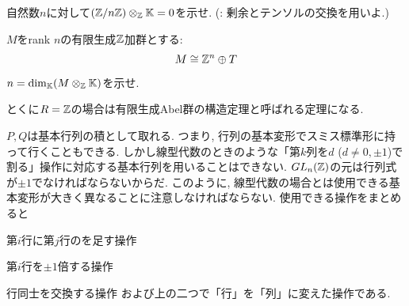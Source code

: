 \begin{prac}
\ben
\item 自然数$n$に対して$(\mathbb{Z}/n\mathbb{Z})\mathbin{\otimes}_{\mathbb{Z}} \mathbb{K}  = 0$を示せ. (: 剰余とテンソルの交換を用いよ.)
\item $M$をrank $n$の有限生成$\mathbb{Z}$加群とする:
\[M\cong \mathbb{Z}^{n} \oplus T\]
$n=\dim_{\mathbb{K}} (M\mathbin{\otimes}_{\mathbb{Z}} \mathbb{K})$を示せ.
\een
\end{prac}

\begin{rem}
とくに$R=\mathbb{Z}$の場合は有限生成Abel群の構造定理と呼ばれる定理になる.
\end{rem}


\begin{rem}
$P,Q$は基本行列の積として取れる. つまり, 行列の基本変形でスミス標準形に持って行くこともできる. しかし線型代数のときのような「第$k$列を$d$ ($d\neq 0,\pm 1$)で割る」操作に対応する基本行列を用いることはできない. $GL_{n}(\mathbb{Z})$の元は行列式が$\pm 1$でなければならないからだ. このように, 線型代数の場合とは使用できる基本変形が大きく異なることに注意しなければならない. 使用できる操作をまとめると
\ben
\item 第$i$行に第$j$行のを足す操作
\item 第$i$行を$\pm 1$倍する操作
\item 行同士を交換する操作
\een
および上の二つで「行」を「列」に変えた操作である.
\end{rem}


